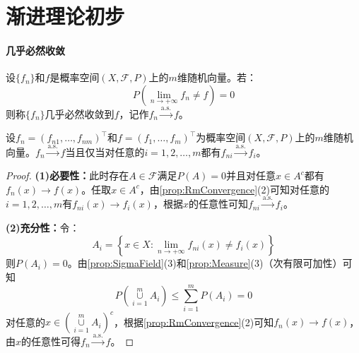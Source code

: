 \chapter{渐进理论初步}

\subsubsection{几乎必然收敛}
\begin{definition}
	设$\{f_n\}$和$f$是概率空间$(X,\mathscr{F},P)$上的$m$维随机向量。若：
	\begin{equation*}
		P\left(\lim_{n\to+\infty}f_n\ne f\right)=0
	\end{equation*}
	则称$\{f_n\}$几乎必然收敛到$f$，记作$f_n\overset{\text{a.s.}}{\longrightarrow}f$。
\end{definition}
\begin{property}\label{prop:a.s.}
	设$f_n=(f_{n1},\dots,f_{nm})^{\top}$和$f=(f_1,\dots,f_m)^{\top}$为概率空间$(X,\mathscr{F},P)$上的$m$维随机向量。$f_n\overset{\text{a.s.}}{\longrightarrow}f$当且仅当对任意的$i=1,2,\dots,m$都有$f_{ni}\overset{\text{a.s.}}{\longrightarrow}f_i$。
\end{property}
\begin{proof}
	\textbf{(1)必要性：}此时存在$A\in\mathscr{F}$满足$P(A)=0$并且对任意$x\in A^c$都有$f_n(x)\to f(x)$。任取$x\in A^c$，由\cref{prop:RmConvergence}(2)可知对任意的$i=1,2,\dots,m$有$f_{ni}(x)\to f_i(x)$，根据$x$的任意性可知$f_{ni}\overset{\text{a.s.}}{\longrightarrow}f_i$。\par
	\textbf{(2)充分性：}令：
	\begin{equation*}
		A_i=\left\{x\in X:\lim_{n\to+\infty}f_{ni}(x)\ne f_i(x)\right\}
	\end{equation*}
	则$P(A_i)=0$。由\cref{prop:SigmaField}(3)和\cref{prop:Measure}(3)（次有限可加性）可知
	\begin{equation*}
		P\left(\underset{i=1}{\overset{m}{\cup}}A_i\right)\leqslant\sum_{i=1}^{m}P(A_i)=0
	\end{equation*}
	对任意的$x\in\left(\underset{i=1}{\overset{m}{\cup}}A_i\right)^c$，根据\cref{prop:RmConvergence}(2)可知$f_n(x)\to f(x)$，由$x$的任意性可得$f_n\overset{\text{a.s.}}{\longrightarrow}f$。
\end{proof}

